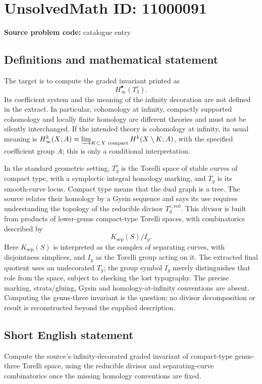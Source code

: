 \documentclass[11pt]{article}
\begin{document}
\section*{UnsolvedMath ID: 11000091}
\textbf{Source problem code:} catalogue entry
\subsection{Definitions and mathematical statement}
The target is to compute the graded invariant printed as
\[
 H^\bullet_\infty(T_3^c).
\]
Its coefficient system and the meaning of the infinity decoration are not defined in the extract. In particular, cohomology at infinity, compactly supported cohomology and locally finite homology are different theories and must not be silently interchanged. If the intended theory is cohomology at infinity, its usual meaning is \(H^k_\infty(X;A)=\varinjlim_{K\subset X\ \mathrm{compact}}H^k(X\setminus K;A)\), with the specified coefficient group \(A\); this is only a conditional interpretation.

In the standard geometric setting, \(T_g^c\) is the Torelli space of stable curves of compact type, with a symplectic integral homology marking, and \(T_g\) is its smooth-curve locus. Compact type means that the dual graph is a tree. The source relates their homology by a Gysin sequence and says its use requires understanding the topology of the reducible divisor \(T_g^{c,\mathrm{red}}\). This divisor is built from products of lower-genus compact-type Torelli spaces, with combinatorics described by
\[
 K_{\mathrm{sep}}(S)/I_g.
\]
Here \(K_{\mathrm{sep}}(S)\) is interpreted as the complex of separating curves, with disjointness simplices, and \(I_g\) as the Torelli group acting on it. The extracted final quotient uses an undecorated \(T_g\); the group symbol \(I_g\) merely distinguishes that role from the space, subject to checking the lost typography. The precise marking, strata/gluing, Gysin and homology-at-infinity conventions are absent. Computing the genus-three invariant is the question; no divisor decomposition or result is reconstructed beyond the supplied description.
\subsection{Short English statement}
Compute the source's infinity-decorated graded invariant of compact-type genus-three Torelli space, using the reducible divisor and separating-curve combinatorics once the missing homology conventions are fixed.
\end{document}
